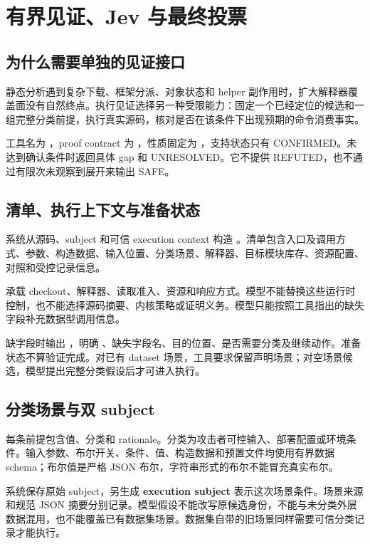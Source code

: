 \section{有界见证、Jev 与最终投票}
\subsection{为什么需要单独的见证接口}
静态分析遇到复杂下载、框架分派、对象状态和 helper 副作用时，扩大解释器覆盖面没有自然终点。执行见证选择另一种受限能力：固定一个已经定位的候选和一组完整分类前提，执行真实源码，核对是否在该条件下出现预期的命令消费事实。

工具名为 ，proof contract 为 ，性质固定为 ，支持状态只有 CONFIRMED。未达到确认条件时返回具体 gap 和 UNRESOLVED。它不提供 REFUTED，也不通过有限次未观察到展开来输出 SAFE。

\subsection{清单、执行上下文与准备状态}
系统从源码、subject 和可信 execution context 构造 。清单包含入口及调用方式、参数、构造数据、输入位置、分类场景、解释器、目标模块库存、资源配置、对照和受控记录信息。

 承载 checkout、解释器、读取准入、资源和响应方式。模型不能替换这些运行时控制，也不能选择源码摘要、内核策略或证明义务。模型只能按照工具指出的缺失字段补充数据型调用信息。

缺字段时输出 ，明确 、缺失字段名、目的位置、是否需要分类及继续动作。准备状态不算验证完成。对已有 dataset 场景，工具要求保留声明场景；对空场景候选，模型提出完整分类假设后才可进入执行。

\subsection{分类场景与双 subject}
每条前提包含值、分类和 rationale。分类为攻击者可控输入、部署配置或环境条件。输入参数、布尔开关、条件、值、构造数据和预置文件均使用有界数据 schema；布尔值是严格 JSON 布尔，字符串形式的布尔不能冒充真实布尔。

系统保存原始 subject，另生成 \textbf{execution subject} 表示这次场景条件。场景来源和规范 JSON 摘要分别记录。模型假设不能改写原候选身份，不能与未分类外层数据混用，也不能覆盖已有数据集场景。数据集自带的旧场景同样需要可信分类记录才能执行。

